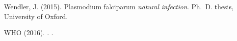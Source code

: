 \documentclass{bioinfo}
\begin{document}
\begin{thebibliography}{}
Wendler, J. (2015).
 {P}lasmodium falciparum {\em natural infection}.
\newblock Ph.\ D. thesis, University of Oxford.

WHO (2016).
.
.



\end{thebibliography}
\end{document}
